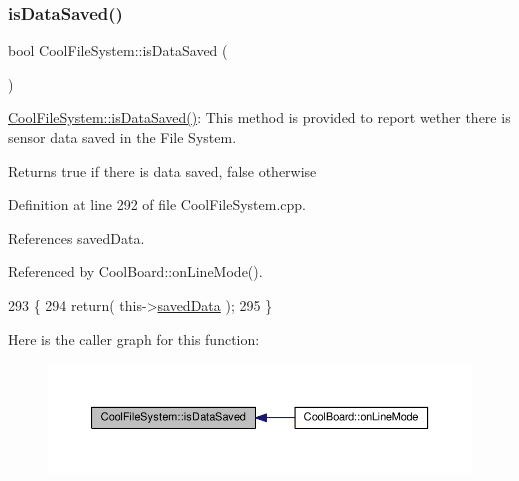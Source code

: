 \mbox{\label{classCoolFileSystem_a5a7eaeea7a9fbf8aaef651d862fa3b5b}} 
\subsubsection{\texorpdfstring{is\+Data\+Saved()}{isDataSaved()}}
{\footnotesize\ttfamily bool Cool\+File\+System\+::is\+Data\+Saved (\begin{DoxyParamCaption}{ }\end{DoxyParamCaption})}

\hyperlink{classCoolFileSystem_a5a7eaeea7a9fbf8aaef651d862fa3b5b}{Cool\+File\+System\+::is\+Data\+Saved()}\+: This method is provided to report wether there is sensor data saved in the File System.

\begin{DoxyReturn}{Returns}
true if there is data saved, false otherwise 
\end{DoxyReturn}


Definition at line 292 of file Cool\+File\+System.\+cpp.



References saved\+Data.



Referenced by Cool\+Board\+::on\+Line\+Mode().


\begin{DoxyCode}
293 \{
294     \textcolor{keywordflow}{return}( this->\hyperlink{classCoolFileSystem_ad398e0c5c41a0c88acdf5d672aa71351}{savedData} );
295 \}
\end{DoxyCode}
Here is the caller graph for this function\+:
\nopagebreak
\begin{figure}[H]
\begin{center}
\leavevmode
\includegraphics[width=350pt]{classCoolFileSystem_a5a7eaeea7a9fbf8aaef651d862fa3b5b_icgraph}
\end{center}
\end{figure}
\mbox{\label{classCoolFileSystem_a4c560c2ddd40b74b7758e6ceb2c58957}} 
